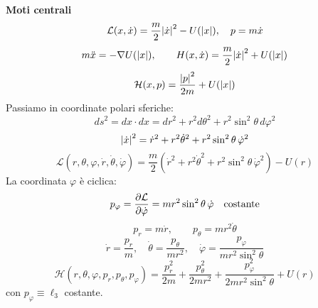 \begin{example}
    \textbf{Moti centrali}
    \begin{equation}
        \mathcal{L}(x,\dot{x})= \frac{m}{2}\abs{\dot{x}}^2 - U(\abs{x}), \quad p= m\dot{x}
    \end{equation}
    \begin{equation}
        m\ddot{x}= -\nabla U(\abs{x}), \qquad 
        H(x,\dot{x})= \frac{m}{2}\abs{\dot{x}}^2 + U(\abs{x})
    \end{equation}
    \begin{equation}
        \mathcal{H}(x,p)= \frac{\abs{p}^2}{2m}+ U(\abs{x})
    \end{equation}
    Passiamo in coordinate polari sferiche:
    \begin{equation}
        ds^2= dx\cdot dx= dr^2+ r^2 d\theta^2+ r^2\sin^2\theta\, d\varphi^2
    \end{equation}
    \begin{equation}
        \abs{\dot{x}}^2= \dot{r}^2+ r^2\dot{\theta}^2+ r^2\sin^2\theta\, \dot{\varphi}^2
    \end{equation}
    \begin{equation}
        \mathcal{L}(r,\theta,\varphi,\dot{r},\dot{\theta},\dot{\varphi})= 
        \frac{m}{2}\left(\dot{r}^2+ r^2\dot{\theta}^2+ r^2\sin^2\theta\,\dot{\varphi}^2\right)- U(r)
    \end{equation}
    La coordinata $\varphi$ è ciclica:
    \begin{equation}
        p_\varphi= \pdv{\mathcal{L}}{\dot{\varphi}}= mr^2\sin^2\theta\,\dot{\varphi} \quad \text{costante}
    \end{equation}
    \begin{equation}
        p_r= m\dot{r}, \qquad p_\theta= mr^2\dot{\theta}
    \end{equation}
    \begin{equation}
        \dot{r}= \frac{p_r}{m}, \quad 
        \dot{\theta}= \frac{p_\theta}{mr^2}, \quad 
        \dot{\varphi}= \frac{p_\varphi}{mr^2\sin^2\theta}
    \end{equation}
    \begin{equation}
        \mathcal{H}(r,\theta,\varphi,p_r,p_\theta,p_\varphi)= 
        \frac{p_r^2}{2m}+ \frac{p_\theta^2}{2mr^2}+ \frac{p_\varphi^2}{2mr^2\sin^2\theta}+ U(r)
    \end{equation}
    con $p_\varphi \equiv \ell_3$ costante.


\end{example}
